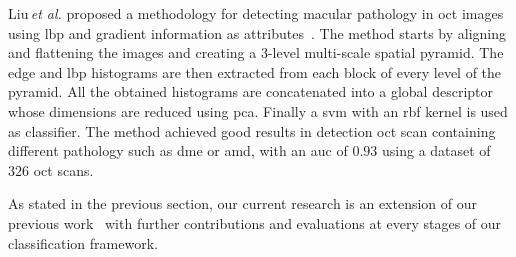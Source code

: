 Liu\,\textit{et al.} proposed a methodology for detecting macular pathology in \ac{oct} images using \ac{lbp} and gradient information as attributes~\cite{Liu2011}.
The method starts by aligning and flattening the images and creating a $3$-level multi-scale spatial pyramid.
The edge and \ac{lbp} histograms are then extracted from each block of every level of the pyramid.
All the obtained histograms are concatenated into a global descriptor whose dimensions are reduced using \ac{pca}.
Finally a \ac{svm} with an \ac{rbf} kernel is used as classifier.
The method achieved good results in detection \ac{oct} scan containing different pathology such as \ac{dme} or \ac{amd}, with an \ac{auc} of $0.93$ using a dataset of $326$ \ac{oct} scans.


As stated in the previous section, our current research is an extension of our previous work~\cite{Lemaitre2015} with further contributions and evaluations at every stages of our classification framework.

%  




